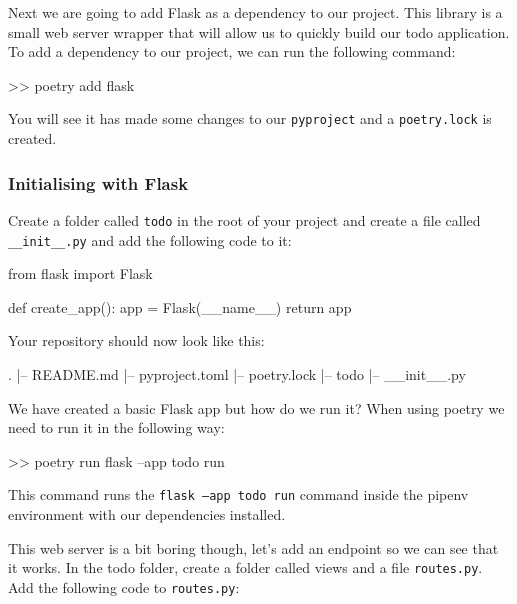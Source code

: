 \documentclass{csse4400}
\begin{document}

Next we are going to add Flask as a dependency to our project. This library is a small web server wrapper that will allow us to quickly build our todo application. To add a dependency to our project, we can run the following command:

\begin{code}[language=bash,numbers=none]{}
  >> poetry add flask
\end{code}

You will see it has made some changes to our \texttt{pyproject} and a \texttt{poetry.lock} is created.

\subsubsection{Initialising with Flask}

Create a folder called  \texttt{todo} in the root of your project and create a file called \texttt{\_\_init\_\_.py} and add the following code to it:

\begin{code}[language=python]{}
  from flask import Flask

  def create_app():
      app = Flask(__name__)
      return app
\end{code}

Your repository should now look like this:

\begin{code}[language=bash,numbers=none]{}
  .
  |-- README.md
  |-- pyproject.toml
  |-- poetry.lock
  |-- todo
      |-- __init__.py
\end{code}

We have created a basic Flask app but how do we run it?
When using poetry we need to run it in the following way:

\begin{code}[language=bash,numbers=none]{}
  >> poetry run flask --app todo run
\end{code}

This command runs the \texttt{flask --app todo run} command inside the pipenv environment with our dependencies installed.

This web server is a bit boring though, let's add an endpoint so we can see that it works. In the todo folder, create a folder called views and a file \texttt{routes.py}. Add the following code to  \texttt{routes.py}:
\end{document}
